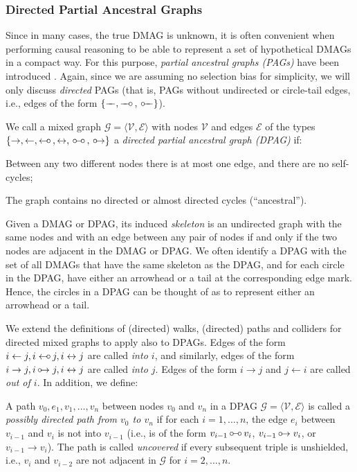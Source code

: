 \documentclass[twoside,11pt]{article}
\newcommand\C[1]{\mathcal{#1}}
\newcommand{\ot}{\leftarrow}
\newcommand{\oto}{\leftrightarrow}
\newcommand{\otc}{\leftarrow\mkern-9mu\circ\,}
\newcommand{\ctc}{\,\circ\mkern-9mu\relbar\mkern-9mu\circ\,}
\newcommand{\cto}{\,\circ\mkern-9mu\rightarrow}
\newcommand{\ctt}{\,\circ\mkern-9mu\relbar\!\!\!\relbar}
\newcommand{\ttt}{\relbar\!\!\!\relbar}
\newcommand{\ttc}{\relbar\!\!\!\relbar\mkern-9mu\circ\,}
\begin{document}
\subsubsection{Directed Partial Ancestral Graphs}\label{sec:app:dpag}

Since in many cases, the true DMAG is unknown, it is often convenient when performing causal reasoning to be able to represent a set of hypothetical DMAGs in a compact way. 
For this purpose, \emph{partial ancestral graphs (PAGs)} have been introduced \citep{Zhang2006}.
Again, since we are assuming no selection bias for simplicity, we will only discuss \emph{directed} PAGs (that is, PAGs without undirected or circle-tail edges, i.e., edges of the form $\{\ttt,\ttc,\ctt\}$).
\begin{definition}
  We call a mixed graph $\C{G} = \langle\C{V},\C{E}\rangle$ with nodes $\C{V}$ and edges $\C{E}$ of the types $\{\to,\ot,\otc,\oto,\ctc,\cto\}$ a \emph{directed partial ancestral graph (DPAG)} if:
  \begin{compactenum}
    \item Between any two different nodes there is at most one edge, and there are no self-cycles;
    \item The graph contains no directed or almost directed cycles (``ancestral'').
  \end{compactenum}
\end{definition}
Given a DMAG or DPAG, its induced \emph{skeleton} is an undirected graph with the same nodes and with an edge between any pair of nodes if and only if the two nodes are adjacent in the DMAG or DPAG.
We often identify a DPAG with the set of all DMAGs that have the same skeleton as the DPAG, and for each circle in the DPAG, have either an arrowhead or a tail at the corresponding edge mark. 
Hence, the circles in a DPAG can be thought of as to represent either an arrowhead or a tail.

We extend the definitions of (directed) walks, (directed) paths and colliders for directed mixed graphs to apply also to DPAGs. 
Edges of the form $i \ot j, i \otc j, i \oto j$ are called \emph{into $i$}, and similarly, edges of the form $i \to j, i \cto j, i \oto j$ are called \emph{into $j$}. Edges of the form $i \to j$ and $j \ot i$ are called \emph{out of $i$}. In addition, we define:
\begin{definition}
  A path $v_0,e_1,v_1,\dots,v_n$ between nodes $v_0$ and $v_n$ in a DPAG $\C{G} = \langle\C{V},\C{E}\rangle$ is called a \emph{possibly directed path from $v_0$ to $v_n$} if for each $i=1,\dots,n$, the edge $e_i$ between $v_{i-1}$ and $v_i$ is not into $v_{i-1}$ (i.e., is of the form $v_{i-1} \ctc v_i$, $v_{i-1} \cto v_i$, or $v_{i-1} \to v_i$). 
  The path is called \emph{uncovered} if every subsequent triple is unshielded, i.e., $v_i$ and $v_{i-2}$ are not adjacent in $\C{G}$ for $i=2,\dots,n$.
\end{definition}
\end{document}
